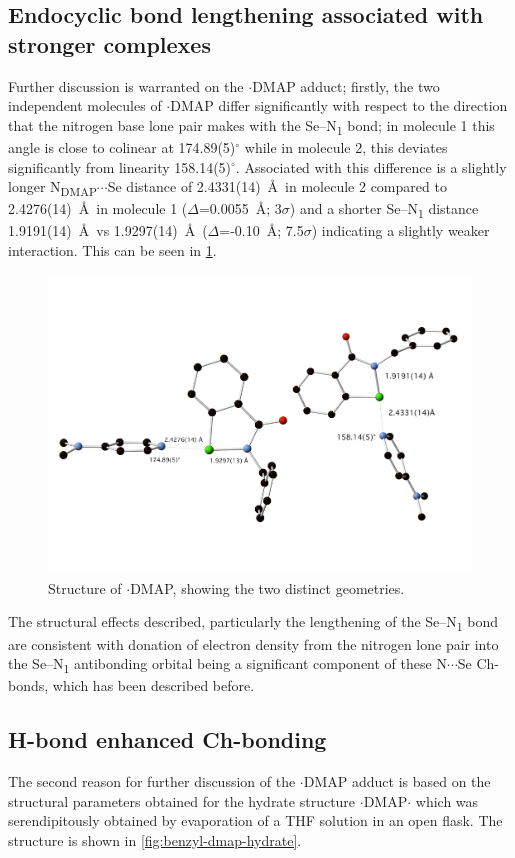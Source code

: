 \begin{refsection}
\subsection{Endocyclic bond lengthening associated with stronger complexes}
Further discussion is warranted on the $\cdot$DMAP adduct; firstly, the two independent molecules of $\cdot$DMAP differ significantly with respect to the direction that the nitrogen base lone pair makes with the Se--N\textsubscript{1} bond; in molecule 1 this angle is close to colinear at 174.89(5)$^\circ$ while in molecule 2, this deviates significantly from linearity 158.14(5)$^\circ$.
Associated with this difference is a slightly longer N\textsubscript{DMAP}$\cdots$Se distance of 2.4331(14)~\AA\ in molecule 2 compared to 2.4276(14)~\AA\ in molecule 1 ($\Delta$=0.0055~\AA ; 3$\sigma$) and a shorter Se--N\textsubscript{1} distance 1.9191(14)~\AA\ vs 1.9297(14)~\AA\ ($\Delta$=-0.10~\AA ; 7.5$\sigma$) indicating a slightly weaker interaction.
This can be seen in \ref{fig:benzyl-dmap-xray-2}.

\begin{figure}
  \centering
  \includegraphics[width=0.8\linewidth]{Figures/benzyl-dmap-xray-2.pdf}
  \caption{Structure of $\cdot$DMAP, showing the two distinct geometries.}
  \label{fig:benzyl-dmap-xray-2}
\end{figure}

The structural effects described, particularly the lengthening of the Se--N\textsubscript{1} bond are consistent with donation of electron density from the nitrogen lone pair into the Se--N\textsubscript{1} antibonding orbital being a significant component of these N$\cdots$Se Ch-bonds, which has been described before\autocite{Pascoe2017}.

\subsection{H-bond enhanced Ch-bonding}
The second reason for further discussion of the $\cdot$DMAP adduct is based on the structural parameters obtained for the hydrate structure $\cdot$DMAP$\cdot$ which was serendipitously obtained by evaporation of a THF solution in an open flask.
The structure is shown in \ref{fig:benzyl-dmap-hydrate}.


\end{refsection}

